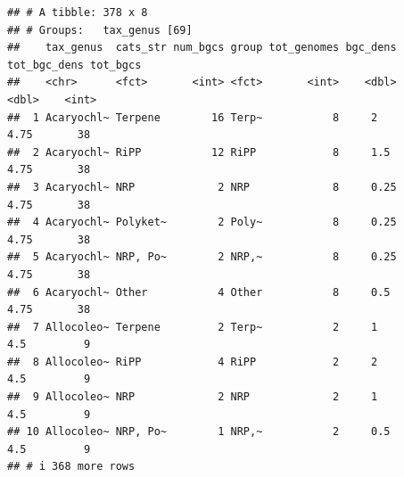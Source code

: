 \documentclass[
]{article}
\newenvironment{Shaded}{\begin{snugshade}}{\end{snugshade}}
\newcommand{\AttributeTok}[1]{\textcolor[rgb]{0.13,0.29,0.53}{#1}}
\newcommand{\CommentTok}[1]{\textcolor[rgb]{0.56,0.35,0.01}{\textit{#1}}}
\newcommand{\DecValTok}[1]{\textcolor[rgb]{0.00,0.00,0.81}{#1}}
\newcommand{\FunctionTok}[1]{\textcolor[rgb]{0.13,0.29,0.53}{\textbf{#1}}}
\newcommand{\NormalTok}[1]{#1}
\newcommand{\OtherTok}[1]{\textcolor[rgb]{0.56,0.35,0.01}{#1}}
\newcommand{\SpecialCharTok}[1]{\textcolor[rgb]{0.81,0.36,0.00}{\textbf{#1}}}
\newcommand{\StringTok}[1]{\textcolor[rgb]{0.31,0.60,0.02}{#1}}
\begin{document}
\begin{Shaded}
\end{Shaded}

\begin{verbatim}
## # A tibble: 378 x 8
## # Groups:   tax_genus [69]
##    tax_genus  cats_str num_bgcs group tot_genomes bgc_dens tot_bgc_dens tot_bgcs
##    <chr>      <fct>       <int> <fct>       <int>    <dbl>        <dbl>    <int>
##  1 Acaryochl~ Terpene        16 Terp~           8     2            4.75       38
##  2 Acaryochl~ RiPP           12 RiPP            8     1.5          4.75       38
##  3 Acaryochl~ NRP             2 NRP             8     0.25         4.75       38
##  4 Acaryochl~ Polyket~        2 Poly~           8     0.25         4.75       38
##  5 Acaryochl~ NRP, Po~        2 NRP,~           8     0.25         4.75       38
##  6 Acaryochl~ Other           4 Other           8     0.5          4.75       38
##  7 Allocoleo~ Terpene         2 Terp~           2     1            4.5         9
##  8 Allocoleo~ RiPP            4 RiPP            2     2            4.5         9
##  9 Allocoleo~ NRP             2 NRP             2     1            4.5         9
## 10 Allocoleo~ NRP, Po~        1 NRP,~           2     0.5          4.5         9
## # i 368 more rows
\end{verbatim}
\end{document}
